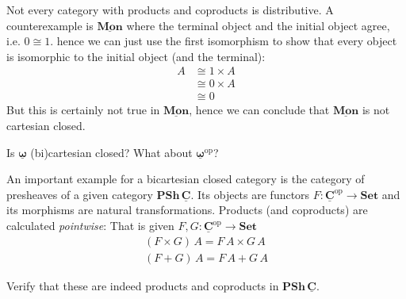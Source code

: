 \documentclass{article}
\newcommand{\Set}{\mathbf{Set}}
\newcommand{\cat}[1]{\underline{\mathbf{#1}}}
\newcommand{\op}{\mathrm{op}}
\newcommand{\PSh}{\mathbf{PSh}}
\begin{document}
Not every category with products and coproducts is distributive. A counterexample is $\cat{Mon}$ where the terminal object and the initial object agree, i.e. $0 \cong 1$. hence we can just use the first isomorphism to show that every object is isomorphic to the initial object (and the terminal):
\begin{align*}
A & \cong 1 \times A \\
& \cong 0 \times A \\
& \cong 0  
\end{align*}
But this is certainly not true in $\cat{Mon}$, hence we can conclude that $\cat{Mon}$ is not cartesian closed. 

\begin{Exercise}
  Is $\cat{\omega}$ (bi)cartesian closed? What about $\cat{\omega}^\op$?
\end{Exercise}

An important example for a bicartesian closed category is the category of presheaves of a given category $\PSh\,\cat{C}$. Its objects are functors $F : \cat{C}^\op \to \Set$ and its morphisms are natural transformations. Products (and coproducts) are calculated \emph{pointwise}: That is given $F,G : \cat{C}^\op \to \Set$
\begin{align*}
  (F \times G)\,A = F\,A \times G\,A \\
  (F + G)\, A = F\,A + G\,A
\end{align*}
\begin{Exercise}
  Verify that these are indeed products and coproducts in $\PSh\,\cat{C}$.
\end{Exercise}
\end{document}
